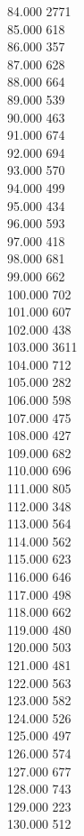 { 84.000	2771 \\
 85.000	618 \\
 86.000	357 \\
 87.000	628 \\
 88.000	664 \\
 89.000	539 \\
 90.000	463 \\
 91.000	674 \\
 92.000	694 \\
 93.000	570 \\
 94.000	499 \\
 95.000	434 \\
 96.000	593 \\
 97.000	418 \\
 98.000	681 \\
 99.000	662 \\
 100.000	702 \\
 101.000	607 \\
 102.000	438 \\
 103.000	3611 \\
 104.000	712 \\
 105.000	282 \\
 106.000	598 \\
 107.000	475 \\
 108.000	427 \\
 109.000	682 \\
 110.000	696 \\
 111.000	805 \\
 112.000	348 \\
 113.000	564 \\
 114.000	562 \\
 115.000	623 \\
 116.000	646 \\
 117.000	498 \\
 118.000	662 \\
 119.000	480 \\
 120.000	503 \\
 121.000	481 \\
 122.000	563 \\
 123.000	582 \\
 124.000	526 \\
 125.000	497 \\
 126.000	574 \\
 127.000	677 \\
 128.000	743 \\
 129.000	223 \\
 130.000	512 \\
}
